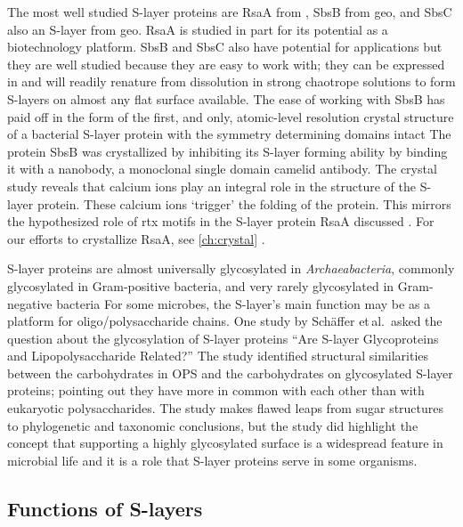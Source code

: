The most well studied \ac{S-layer} proteins are RsaA from \caulobacter{}, SbsB from
\ac{geo}, and SbsC also an \ac{S-layer} from \ac{geo}. RsaA is studied in part
for its potential as a biotechnology platform. SbsB and SbsC also have potential
for applications but they are well studied because they are easy to work with;
they can be expressed in \ecoli{} and will readily renature from dissolution in
strong chaotrope solutions to form \acp{S-layer} on almost any flat surface available. The ease of working with SbsB has paid off in the form of the first, and only, atomic-level resolution crystal structure of a bacterial \ac{S-layer} protein with the symmetry determining domains intact The protein SbsB was crystallized by inhibiting its \ac{S-layer} forming ability by binding it with a nanobody, a monoclonal single domain camelid antibody. The crystal study reveals that calcium ions play an integral role in the structure of the \ac{S-layer} protein. These calcium ions `trigger' the folding of the protein. This mirrors the hypothesized role of \ac{rtx} motifs in the \caulobacter{} \ac{S-layer} protein RsaA discussed . For our efforts to crystallize RsaA, see \cref{ch:crystal} .
 
\ac{S-layer} proteins are almost universally glycosylated in \textit{Archaeabacteria}, commonly
glycosylated in Gram-positive bacteria, and very rarely glycosylated in Gram-negative
bacteria
For some microbes, the \ac{S-layer}'s main function may be as a platform for oligo/polysaccharide chains. One study by Sch\"{a}ffer et\,al.~asked the question about the glycosylation of \ac{S-layer} proteins ``Are \ac{S-layer} Glycoproteins and Lipopolysaccharide Related?'' The study identified structural similarities between the carbohydrates in \ac{OPS} and the carbohydrates on glycosylated \ac{S-layer} proteins; pointing out they have more in common with each other than with eukaryotic polysaccharides. The study makes flawed leaps from sugar structures to phylogenetic and taxonomic conclusions, but the study did highlight the concept that supporting a highly glycosylated surface is a widespread feature in microbial life and it is a role that \ac{S-layer} proteins serve in some organisms. 

  \subsection{Functions of S-layers}
  \label{sec:intro-slayersfunction}

